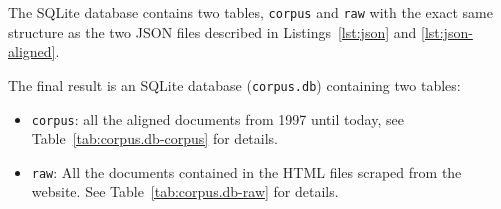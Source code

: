 The SQLite database contains two tables, \texttt{corpus} and \texttt{raw} with the exact same structure as the two JSON files described in Listings~\ref{lst:json} and \ref{lst:json-aligned}.

The final result is an SQLite database (\texttt{corpus.db}) containing two tables:
\begin{itemize}
	\item \texttt{corpus}: all the aligned documents from 1997 until today, see Table~\ref{tab:corpus.db-corpus} for details.




	\item \texttt{raw}: All the documents contained in the HTML files scraped from the website. 
	See Table~\ref{tab:corpus.db-raw} for details. 
\end{itemize}



